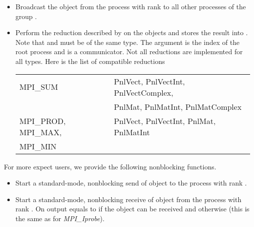 \begin{itemize}
  
\item {}
  \sshortdescribe Broadcast the object  from the process with rank
   to all other processes of the group .

\item {}
  \sshortdescribe Perform the reduction described by  on
  the objects  and stores the result into . Note that
   and  must be of the same type. The argument
   is the index of the root process and  is a communicator.
  Not all reductions are implemented for all types. Here is the list of
  compatible reductions

  \begin{center}
  \begin{tabular}{l@{\hskip 1em}|@{\hskip 1em}l}

    MPI_SUM            & PnlVect, PnlVectInt, PnlVectComplex, \\
                       & PnlMat, PnlMatInt, PnlMatComplex \\
    \hline
    MPI_PROD, MPI_MAX, & PnlVect, PnlVectInt, PnlMat, PnlMatInt \\
    MPI_MIN            & 
  \end{tabular}
  \end{center}
\end{itemize}

For more expect users, we provide the following nonblocking functions.
\begin{itemize}
\item {}
  \sshortdescribe Start a standard-mode, nonblocking send of object
   to the process with rank .
  
  
\item {}
  \sshortdescribe Start a standard-mode, nonblocking receive of object
   from the process with rank . On output  equals
  to  if the object can be received and  otherwise (this
  is the same as for {\it MPI_Iprobe}).
\end{itemize}

